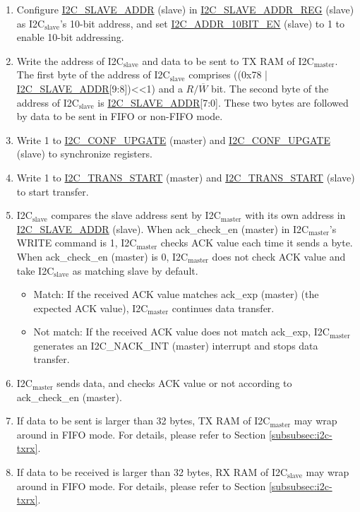 \documentclass[main\_\_EN.tex]{subfiles}
\begin{document}
\begin{enumerate}
\item Configure \hyperref[fielddesc:I2CSLAVEADDR]{I2C\_SLAVE\_ADDR} (slave) in \hyperref[regdesc:I2CSLAVEADDRREG]{I2C\_SLAVE\_ADDR\_REG} (slave) as I2C$_\text{slave}$'s 10-bit address, and set \hyperref[fielddesc:I2CADDR10BITEN]{I2C\_ADDR\_10BIT\_EN} (slave) to 1 to enable 10-bit addressing.
\item Write the address of I2C$_\text{slave}$ and data to be sent to TX RAM of I2C$_\text{master}$. The first byte of the address of I2C$_\text{slave}$ comprises ((0x{}78 | \hyperref[fielddesc:I2CSLAVEADDR]{I2C\_SLAVE\_ADDR}[9:8])<<1) and a $R/\overline W$ bit. The second byte of the address of I2C$_\text{slave}$ is \hyperref[fielddesc:I2CSLAVEADDR]{I2C\_SLAVE\_ADDR}[7:0]. These two bytes are followed by data to be sent in FIFO or non-FIFO mode.
\item Write 1 to \hyperref[fielddesc:I2CCONFUPGATE]{I2C\_CONF\_UPGATE} (master) and \hyperref[fielddesc:I2CCONFUPGATE]{I2C\_CONF\_UPGATE} (slave) to synchronize registers.
\item Write 1 to \hyperref[fielddesc:I2CTRANSSTART]{I2C\_TRANS\_START} (master) and \hyperref[fielddesc:I2CTRANSSTART]{I2C\_TRANS\_START} (slave) to start transfer.
\item I2C$_\text{slave}$ compares the slave address sent by I2C$_\text{master}$ with its own address in \hyperref[fielddesc:I2CSLAVEADDR]{I2C\_SLAVE\_ADDR} (slave). When ack\_check\_en (master) in I2C$_\text{master}$'s WRITE command is 1, I2C$_\text{master}$ checks ACK value each time it sends a byte. When ack\_check\_en (master) is 0, I2C$_\text{master}$ does not check ACK value and take I2C$_\text{slave}$ as matching slave by default.
\begin{itemize}
\item Match: If the received ACK value matches ack\_exp (master) (the expected ACK value), I2C$_\text{master}$ continues data transfer.
\item Not match: If the received ACK value does not match ack\_exp, I2C$_\text{master}$ generates an I2C\_NACK\_INT (master) interrupt and stops data transfer.
\end{itemize}

\item I2C$_\text{master}$ sends data, and checks ACK value or not according to ack\_check\_en (master).
\item If data to be sent is larger than 32 bytes, TX RAM of I2C$_\text{master}$ may wrap around in FIFO mode. For details, please refer to Section \ref{subsubsec:i2c-txrx}.
\item If data to be received is larger than 32 bytes, RX RAM of I2C$_\text{slave}$ may wrap around in FIFO mode. For details, please refer to Section \ref{subsubsec:i2c-txrx}.


\end{enumerate}
\end{document}
